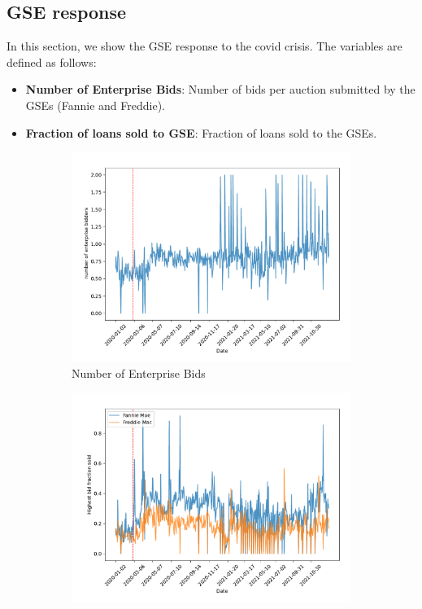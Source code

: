 \documentclass[11pt,a4paper]{article}
\begin{document}
\pagebreak
\subsection{GSE response }

 In this section, we show the GSE response to the covid crisis. The variables are defined as follows:
\begin{itemize}
\item \textbf{Number of Enterprise Bids}: Number of bids per auction submitted by the GSEs (Fannie and Freddie).
\item \textbf{Fraction of loans sold to GSE}: Fraction of loans sold to the GSEs.
\end{itemize}

\begin{figure}[h]
  \centering
  \begin{subfigure}[b]{0.49\textwidth}
      \includegraphics[width=0.998\textwidth]{../results/figures/Number of Enterprise Bidders_mean_mat30_loan1_timeseries_nr_1_7.pdf}
      \caption{Number of Enterprise Bids}
     \end{subfigure}
     \begin{subfigure}[b]{0.49\textwidth}
      \includegraphics[width=0.998\textwidth]{../results/figures/sold_FreddieBid_mean_mat30_loan1_timeseries_nr_1_7.pdf}

\end{subfigure}
\end{figure}
\end{document}
